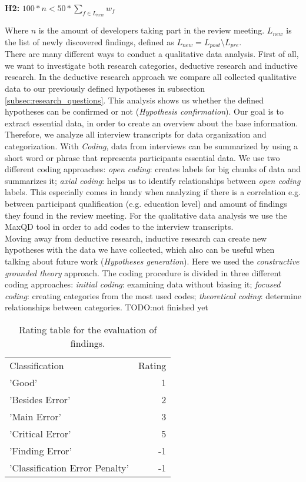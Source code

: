 \begin{center}
\textbf{H2:} $100 * n < 50* \sum_{f \in L_{new}} w_f$
\end{center}

Where $n$ is the amount of developers taking part in the review meeting. $L_{new}$ is the list of newly discovered findings, defined as $L_{new} = L_{post} \setminus L_{pre}$. \\

There are many different ways to conduct a qualitative data analysis. First of all, we want to investigate both research categories, deductive research and inductive research.
In the deductive research approach we compare all collected qualitative data to our previously defined hypotheses in subsection \ref{subsec:research_questions}. This analysis shows us whether the defined hypotheses can be confirmed or not (\textit{Hypothesis confirmation}). Our goal is to extract essential data, in order to create an overview about the base information. Therefore, we analyze all interview transcripts for data organization and categorization. With \textit{Coding}, data from interviews can be summarized by using a short word or phrase that represents participants essential data. We use two different coding approaches: \textit{open coding}: creates labels for big chunks of data and summarizes it; \textit{axial coding}: helps us to identify relationships between \textit{open coding} labels. This especially comes in handy when analyzing if there is a correlation e.g. between participant qualification (e.g. education level) and amount of findings they found in the review meeting. For the qualitative data analysis we use the MaxQD tool in order to add codes to the interview transcripts. \\
Moving away from deductive research, inductive research can create new hypotheses with the data we have collected, which also can be useful when talking about future work (\textit{Hypotheses generation}). Here we used the \textit{constructive grounded theory} approach. The coding procedure is divided in three different coding approaches: \textit{initial coding}: examining data without biasing it; \textit{focused coding}: creating categories from the most used codes; \textit{theoretical coding}: determine relationships between categories.
TODO:not finished yet

\begin{table}
\centering
\begin{tabular}{lr}
  \rowcolor{heading}Classification & Rating \\
  \rowcolor{a}'Good' & 1 \\
  \rowcolor{b}'Besides Error' & 2 \\
  \rowcolor{a}'Main Error' & 3 \\
  \rowcolor{b}'Critical Error' & 5 \\
  \rowcolor{a}'Finding Error' & -1 \\
  \rowcolor{b}'Classification Error Penalty' & -1 \\
\end{tabular}
\caption{Rating table for the evaluation of findings.}
\label{tab:ratings}
\end{table}


